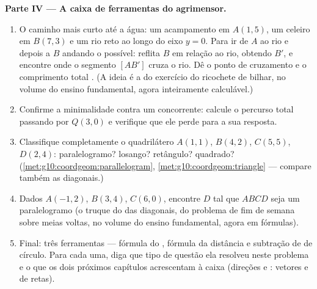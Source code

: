 \begin{problem}
\medskip
\noindent\textbf{Parte IV --- A caixa de ferramentas do
agrimensor.}
\begin{enumerate}[resume]
  \item O caminho mais curto até a água: um acampamento em
        $A(1, 5)$, um celeiro em $B(7, 3)$ e um rio reto ao longo
        do eixo $y = 0$. Para ir de $A$ ao rio e depois a $B$
        andando o  possível: reflita $B$ em relação ao rio,
        obtendo $B'$, e encontre onde o segmento $[AB']$ cruza o
        rio. Dê o ponto de cruzamento e o comprimento total
        . (A ideia é a do exercício do ricochete de
        bilhar, no volume do ensino fundamental, agora
        inteiramente calculável.)
  \item Confirme a minimalidade contra um concorrente: calcule o
        percurso total passando por $Q(3, 0)$ e verifique que ele
        perde para a sua resposta.
  \item Classifique completamente o quadrilátero $A(1,1)$,
        $B(4,2)$, $C(5,5)$, $D(2,4)$: paralelogramo? losango?
        retângulo? quadrado?
        (\cref{met:g10:coordgeom:parallelogram},
        \cref{met:g10:coordgeom:triangle} --- compare também as
        diagonais.)
  \item Dados $A(-1, 2)$, $B(3, 4)$, $C(6, 0)$, encontre $D$ tal
        que $ABCD$ seja um paralelogramo (o truque do 
        das diagonais, do problema de fim de semana sobre meias
        voltas, no volume do ensino fundamental, agora em
        fórmulas).
  \item Final: três ferramentas --- fórmula do ,
        fórmula da distância e subtração de  de círculo.
        Para cada uma, diga que tipo de questão ela resolveu
        neste problema e o que os dois próximos capítulos
        acrescentam à caixa (direções e :
        vetores e  de retas).
\end{enumerate}
\end{problem}
